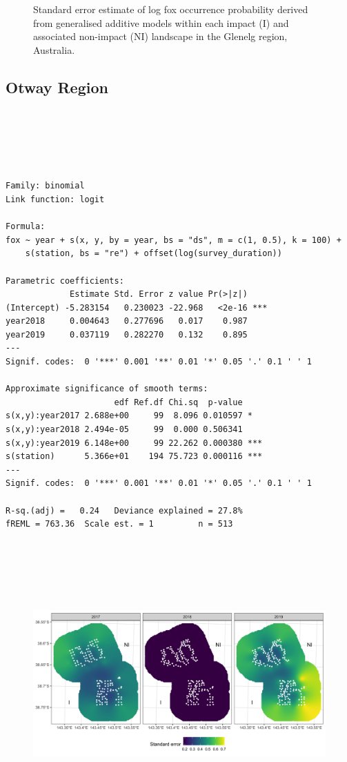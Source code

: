 \documentclass[11pt,a4paper,titlepage,twoside,openright]{style/unimelbthesis}
\begin{document}
\begin{mainmatter}
\begin{figure}
{}

\caption{Standard error estimate of log fox occurrence probability derived from generalised additive models within each impact (I) and associated non-impact (NI) landscape in the Glenelg region, Australia.}\label{fig:density-fox-se-g}
\end{figure}
\newpage

\hypertarget{otway-region-1}{%
\subsection{Otway Region}\label{otway-region-1}}

\(~\)

\(~\)

\(~\)
\begin{verbatim}
Family: binomial 
Link function: logit 

Formula:
fox ~ year + s(x, y, by = year, bs = "ds", m = c(1, 0.5), k = 100) + 
    s(station, bs = "re") + offset(log(survey_duration))

Parametric coefficients:
             Estimate Std. Error z value Pr(>|z|)    
(Intercept) -5.283154   0.230023 -22.968   <2e-16 ***
year2018     0.004643   0.277696   0.017    0.987    
year2019     0.037119   0.282270   0.132    0.895    
---
Signif. codes:  0 '***' 0.001 '**' 0.01 '*' 0.05 '.' 0.1 ' ' 1

Approximate significance of smooth terms:
                      edf Ref.df Chi.sq  p-value    
s(x,y):year2017 2.688e+00     99  8.096 0.010597 *  
s(x,y):year2018 2.494e-05     99  0.000 0.506341    
s(x,y):year2019 6.148e+00     99 22.262 0.000380 ***
s(station)      5.366e+01    194 75.723 0.000116 ***
---
Signif. codes:  0 '***' 0.001 '**' 0.01 '*' 0.05 '.' 0.1 ' ' 1

R-sq.(adj) =   0.24   Deviance explained = 27.8%
fREML = 763.36  Scale est. = 1         n = 513
\end{verbatim}
\newpage

\(~\)

\(~\)

\(~\)
\begin{figure}

{\centering \includegraphics[width=1\linewidth]{figure/fox_occ_se_otways_600dpi} 

}
\end{figure}
\end{mainmatter}
\end{document}
